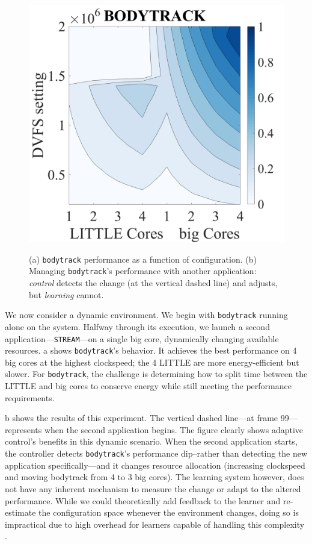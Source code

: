 \begin{figure}
\centering
    \includegraphics[width=.37\textwidth]{figures/BODYTRACK-contour.png}
    \label{fig:BODYTRACK_contour}
    
    \label{fig:BODYTRACK_timeline}
  \caption{(a) \texttt{bodytrack} performance as a function of
    configuration. (b) Managing \texttt{bodytrack}'s performance with
    another application: \emph{control} detects the change (at the
    vertical dashed line) and adjusts, but \emph{learning} cannot. }
  \label{fig:control}
\end{figure}


We now consider a dynamic environment.  We begin with
\texttt{bodytrack} running alone on the system.  Halfway through its
execution, we launch a second application---\texttt{STREAM}---on a
single big core, dynamically changing available resources.
a shows \texttt{bodytrack}'s behavior.
It achieves the best performance on 4 big cores at the highest
clockspeed; the 4 LITTLE are more energy-efficient but slower.  For
\texttt{bodytrack}, the challenge is determining how to split time
between the LITTLE and big cores to conserve energy while still
meeting the performance requirements.

b shows the results of this experiment.
The vertical dashed line---at frame 99---represents when the second
application begins.  The figure clearly shows adaptive control's
benefits in this dynamic scenario.  When the second application
starts, the controller detects \texttt{bodytrack}'s performance
dip--rather than detecting the new application specifically---and it
changes resource allocation (increasing clockspeed and moving
bodytrack from 4 to 3 big cores).  The learning system however, does
not have any inherent mechanism to measure the change or adapt to the
altered performance.  While we could theoretically add feedback to the
learner and re-estimate the configuration space whenever the
environment changes, doing so is impractical due to high overhead for
learners capable of handling this complexity
\cite{Paragon,quasar,LEO}.


